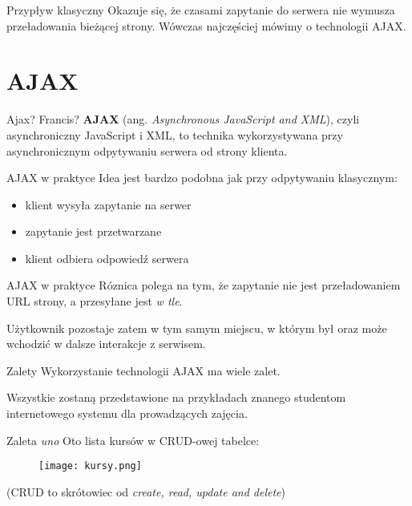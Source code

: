 \begin{frame}{Przypływ klasyczny}
	Okazuje się, że czasami zapytanie do serwera nie wymusza przeładowania bieżącej strony. Wówczas najczęściej mówimy o technologii AJAX.
\end{frame}

\section{AJAX}

\begin{frame}{Ajax? Francis?}
	\textbf{AJAX} (ang. \emph{Asynchronous JavaScript and XML}), czyli asynchroniczny JavaScript i XML, to technika wykorzystywana przy asynchronicznym odpytywaniu serwera od strony klienta.
\end{frame}

\begin{frame}{AJAX w praktyce}
	Idea jest bardzo podobna jak przy odpytywaniu klasycznym:
	\begin{itemize}
	\item klient wysyła zapytanie na serwer
	\item zapytanie jest przetwarzane
	\item klient odbiera odpowiedź serwera
	\end{itemize}
\end{frame}

\begin{frame}{AJAX w praktyce}
	Róznica polega na tym, że zapytanie nie jest przeładowaniem URL strony, a przesyłane jest \emph{w tle}.
	
	Użytkownik pozostaje zatem w tym samym miejscu, w którym był oraz może wchodzić w dalsze interakcje z serwisem.
\end{frame}

\begin{frame}{Zalety}
	Wykorzystanie technologii AJAX ma wiele zalet. 
	
	Wszystkie zostaną przedstawione na przykładach znanego studentom internetowego systemu dla prowadzących zajęcia.
\end{frame}

\begin{frame}{Zaleta \emph{uno}}
	Oto lista kursów w CRUD-owej tabelce:
	\begin{figure}[t]
		\centering
		\texttt{[image: kursy.png]}
	\end{figure}
	
	(CRUD to skrótowiec od \emph{create, read, update and delete})
\end{frame}

